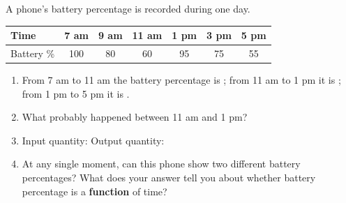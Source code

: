 \documentclass[10pt]{article}
\begin{document}
\vspace{0.1in}

\boxguard
\begin{tcolorbox}[colback=white, colframe=black!40,
    title=\textbf{Tier A --- Approaching Proficiency},
    fonttitle=\bfseries, arc=2mm, left=3mm, right=3mm, top=2mm, bottom=2mm]

A phone's battery percentage is recorded during one day.

\smallskip
\renewcommand{\arraystretch}{1.4}
\begin{tabular}{|l|c|c|c|c|c|c|}
\hline
Time & 7 am & 9 am & 11 am & 1 pm & 3 pm & 5 pm \\
\hline
Battery \% & 100 & 80 & 60 & 95 & 75 & 55 \\
\hline
\end{tabular}
\smallskip

\begin{enumerate}[itemsep=8pt]
  \item From 7 am to 11 am the battery percentage is ;
        from 11 am to 1 pm it is ;
        from 1 pm to 5 pm it is .

  \item What probably happened between 11 am and 1 pm?

        \vspace{0.05in}

  \item Input quantity:  \quad Output quantity: 

  \item At any single moment, can this phone show two different battery
        percentages? What does your answer tell you about whether battery
        percentage is a \textbf{function} of time?

        \vspace{0.05in}
\end{enumerate}
\end{tcolorbox}

\vspace{0.1in}
\end{document}
